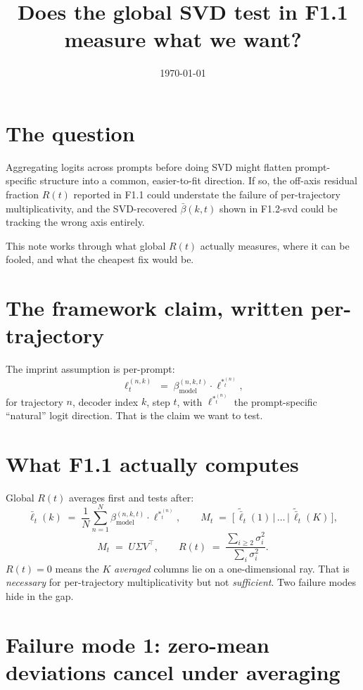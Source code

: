 \documentclass[11pt]{article}
\title{Does the global SVD test in F1.1 measure what we want?}
\author{}
\date{\today}
\newcommand{\Rt}{R(t)}
\newcommand{\lstar}{\ell^{*}}
\newcommand{\bbar}{\bar\beta}
\begin{document}
\maketitle

\section{The question}

Aggregating logits across prompts before doing SVD might flatten prompt-specific structure into a common, easier-to-fit direction.
If so, the off-axis residual fraction \(\Rt\) reported in F1.1 could understate the failure of per-trajectory multiplicativity,
and the SVD-recovered \(\bbar(k,t)\) shown in F1.2-svd could be tracking the wrong axis entirely.

This note works through what global \(\Rt\) actually measures, where it can be fooled, and what the cheapest fix would be.

\section{The framework claim, written per-trajectory}

The imprint assumption is per-prompt:
\[
\ell_t^{(n,k)} \;=\; \beta_{\text{model}}^{(n,k,t)} \cdot \lstar^{(n)}_t,
\]
for trajectory \(n\), decoder index \(k\), step \(t\),
with \(\lstar^{(n)}_t\) the prompt-specific ``natural'' logit direction.
That is the claim we want to test.

\section{What F1.1 actually computes}

Global \(\Rt\) averages first and tests after:
\[
\bar\ell_t(k) \;=\; \frac{1}{N}\sum_{n=1}^{N} \beta_{\text{model}}^{(n,k,t)} \cdot \lstar^{(n)}_t,
\qquad
M_t \;=\; \bigl[\,\widetilde{\bar\ell}_t(1)\,\bigl|\,\dots\,\bigl|\,\widetilde{\bar\ell}_t(K)\,\bigr],
\]
\[
M_t \;=\; U\Sigma V^\top, \qquad \Rt \;=\; \frac{\sum_{i\geq 2}\sigma_i^2}{\sum_i \sigma_i^2}.
\]
\(\Rt=0\) means the \(K\) \emph{averaged} columns lie on a one-dimensional ray.
That is \emph{necessary} for per-trajectory multiplicativity but not \emph{sufficient}.
Two failure modes hide in the gap.

\section{Failure mode 1: zero-mean deviations cancel under averaging}
\end{document}
